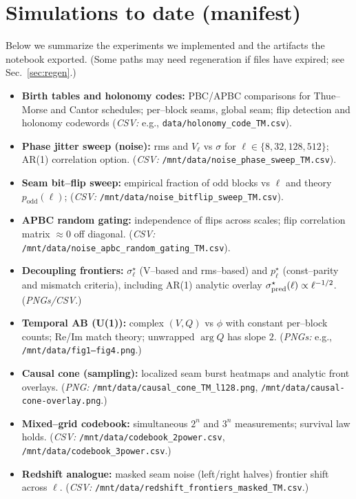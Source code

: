 \documentclass[11pt]{article}
\begin{document}
\section{Simulations to date (manifest)}
Below we summarize the experiments we implemented and the artifacts the notebook exported. (Some paths may need regeneration if files have expired; see Sec.~\ref{sec:regen}.)
\begin{itemize}
  \item \textbf{Birth tables and holonomy codes:} PBC/APBC comparisons for Thue--Morse and Cantor schedules; per--block seams, global seam; flip detection and holonomy codewords (\emph{CSV:} e.g., \texttt{data/holonomy\_code\_TM.csv}).
  \item \textbf{Phase jitter sweep (noise):} rms and $V_\ell$ vs $\sigma$ for $\ell\in\{8,32,128,512\}$; AR(1) correlation option. (\emph{CSV:} \texttt{/mnt/data/noise\_phase\_sweep\_TM.csv}).
  \item \textbf{Seam bit--flip sweep:} empirical fraction of odd blocks vs $\ell$ and theory $p_{\mathrm{odd}}(\ell)$; (\emph{CSV:} \texttt{/mnt/data/noise\_bitflip\_sweep\_TM.csv}).
  \item \textbf{APBC random gating:} independence of flips across scales; flip correlation matrix $\approx 0$ off diagonal. (\emph{CSV:} \texttt{/mnt/data/noise\_apbc\_random\_gating\_TM.csv}).
  \item \textbf{Decoupling frontiers:} $\sigma_\ell^\star$ (V--based and rms--based) and $p_\ell^\star$ (const--parity and mismatch criteria), including AR(1) analytic overlay $\sigma^\star_{\rm pred}(\ell)\propto \ell^{-1/2}$. (\emph{PNGs/CSV}.)
  \item \textbf{Temporal AB (U(1)):} complex $(V,Q)$ vs $\phi$ with constant per--block counts; Re/Im match theory; unwrapped $\arg Q$ has slope $2$. (\emph{PNGs:} e.g., \texttt{/mnt/data/fig1--fig4.png}.)
  \item \textbf{Causal cone (sampling):} localized seam burst heatmaps and analytic front overlays. (\emph{PNG:} \texttt{/mnt/data/causal\_cone\_TM\_l128.png}, \texttt{/mnt/data/causal-cone-overlay.png}.)
  \item \textbf{Mixed--grid codebook:} simultaneous $2^n$ and $3^n$ measurements; survival law holds. (\emph{CSV:} \texttt{/mnt/data/codebook\_2power.csv}, \texttt{/mnt/data/codebook\_3power.csv}.)
  \item \textbf{Redshift analogue:} masked seam noise (left/right halves) frontier shift across $\ell$. (\emph{CSV:} \texttt{/mnt/data/redshift\_frontiers\_masked\_TM.csv}.)
\end{itemize}
\end{document}
